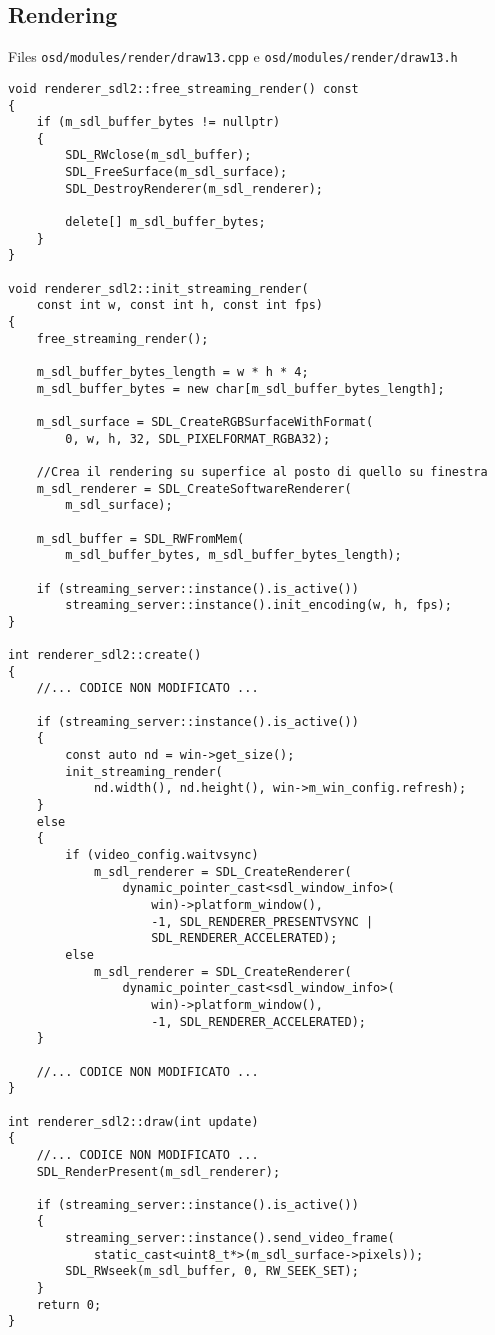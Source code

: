 \subsection{Rendering}
Files \verb|osd/modules/render/draw13.cpp| e \verb|osd/modules/render/draw13.h|

\begin{lstlisting}
void renderer_sdl2::free_streaming_render() const
{
	if (m_sdl_buffer_bytes != nullptr)
	{
		SDL_RWclose(m_sdl_buffer);
		SDL_FreeSurface(m_sdl_surface);
		SDL_DestroyRenderer(m_sdl_renderer);

		delete[] m_sdl_buffer_bytes;
	}
}

void renderer_sdl2::init_streaming_render(
	const int w, const int h, const int fps)
{
	free_streaming_render();

	m_sdl_buffer_bytes_length = w * h * 4;
	m_sdl_buffer_bytes = new char[m_sdl_buffer_bytes_length];

	m_sdl_surface = SDL_CreateRGBSurfaceWithFormat(
		0, w, h, 32, SDL_PIXELFORMAT_RGBA32);

	//Crea il rendering su superfice al posto di quello su finestra
	m_sdl_renderer = SDL_CreateSoftwareRenderer(
		m_sdl_surface);

	m_sdl_buffer = SDL_RWFromMem(
		m_sdl_buffer_bytes, m_sdl_buffer_bytes_length);

	if (streaming_server::instance().is_active())
		streaming_server::instance().init_encoding(w, h, fps);
}

int renderer_sdl2::create()
{
	//... CODICE NON MODIFICATO ...

	if (streaming_server::instance().is_active())
	{
		const auto nd = win->get_size();
		init_streaming_render(
			nd.width(), nd.height(), win->m_win_config.refresh);
	}
	else
	{
		if (video_config.waitvsync)
			m_sdl_renderer = SDL_CreateRenderer(
				dynamic_pointer_cast<sdl_window_info>(
					win)->platform_window(), 
					-1, SDL_RENDERER_PRESENTVSYNC | 
					SDL_RENDERER_ACCELERATED);
		else
			m_sdl_renderer = SDL_CreateRenderer(
				dynamic_pointer_cast<sdl_window_info>(
					win)->platform_window(), 
					-1, SDL_RENDERER_ACCELERATED);
	}

	//... CODICE NON MODIFICATO ...
}

int renderer_sdl2::draw(int update)
{
	//... CODICE NON MODIFICATO ...
	SDL_RenderPresent(m_sdl_renderer);	

	if (streaming_server::instance().is_active())
	{
		streaming_server::instance().send_video_frame(
			static_cast<uint8_t*>(m_sdl_surface->pixels));
		SDL_RWseek(m_sdl_buffer, 0, RW_SEEK_SET);
	}
	return 0;
}
\end{lstlisting}

